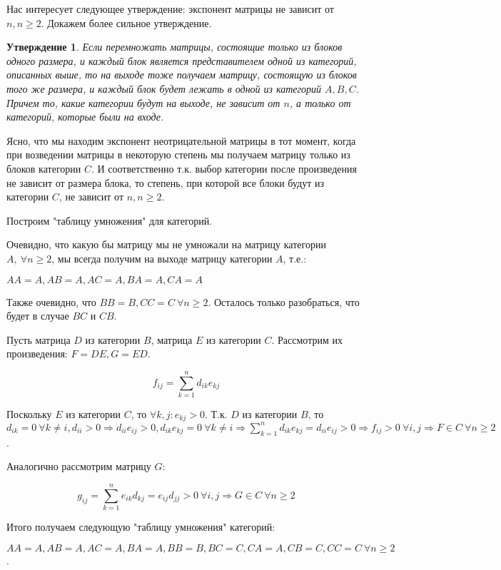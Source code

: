 \documentclass[a4paper,12pt]{report}
\theoremstyle{plain} %
\newtheorem{Statement}{Утверждение}[chapter]
\theoremstyle{definition}
\theoremstyle{remark}
\begin{document}
\begin{large}
Нас интересует следующее утверждение: экспонент матрицы не зависит от $n, n \geq 2$. Докажем более сильное утверждение.

\begin{Statement}
Если перемножать матрицы, состоящие только из блоков одного размера, и каждый блок является представителем одной из категорий, описанных выше, то на выходе тоже получаем матрицу, состоящую из блоков того же размера, и каждый блок будет лежать в одной из категорий $A,B,C$. Причем то, какие категории будут на выходе, не зависит от $n$, а только от категорий, которые были на входе.
\end{Statement}
Ясно, что мы находим экспонент неотрицательной матрицы в тот момент, когда при возведении матрицы в некоторую степень мы получаем матрицу только из блоков категории $C$. И соответственно т.к. выбор категории после произведения не зависит от размера блока, то степень, при которой все блоки будут из категории $C$, не зависит от $n, n \geq 2$.

Построим "таблицу умножения" для категорий.

Очевидно, что какую бы матрицу мы не умножали на матрицу категории $A, ~\forall n \geq 2$, мы всегда получим на выходе матрицу категории $A$, т.е.:

$AA = A, AB = A, AC = A, BA = A, CA = A$

Также очевидно, что $BB = B, CC = C ~\forall n \geq 2$. Осталось только разобраться, что будет в случае $BC$ и $CB$.

Пусть матрица $D$ из категории $B$, матрица $E$ из категории $C$. Рассмотрим их произведения: $F = DE, G = ED$.

$$f_{ij} = \sum_{k=1}^n d_{ik}e_{kj}$$

Поскольку $E$ из категории $C$, то $\forall k,j: e_{kj} > 0$. Т.к. $D$ из категории $B$, то $d_{ik} = 0~ \forall k \neq i, d_{ii} > 0 \Rightarrow d_{ii}e_{ij} > 0, d_{ik}e_{kj} = 0~ \forall k \neq i \Rightarrow \sum_{k=1}^n d_{ik}e_{kj} = d_{ii}e_{ij} > 0 \Rightarrow f_{ij} > 0~ \forall i,j \Rightarrow F \in C ~\forall n \geq 2$.

Аналогично рассмотрим матрицу $G$:

$$g_{ij} = \sum_{k=1}^n e_{ik}d_{kj} = e_{ij}d_{jj} > 0 ~\forall i,j \Rightarrow G \in C ~\forall n \geq 2$$

Итого получаем следующую "таблицу умножения" категорий:

$AA = A, AB = A, AC = A, BA = A, BB = B, BC = C, CA = A, CB = C, CC = C ~\forall n \geq 2$.


\end{large}
\end{document}
